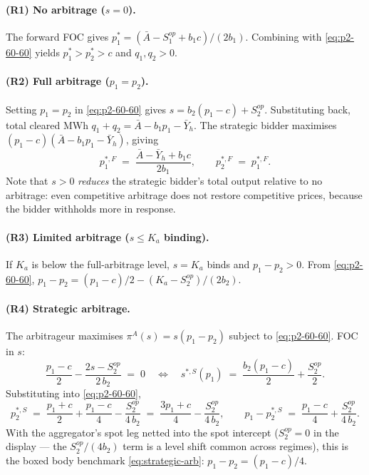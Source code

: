 \documentclass[11pt,a4paper]{article}
\theoremstyle{definition}
\theoremstyle{remark}
\theoremstyle{plain}
\begin{document}
\paragraph{(R1) No arbitrage ($s = 0$).} The forward FOC gives $p_1^* = (\bar A - S^{op}_1 + b_1 c)/(2 b_1)$. Combining with \eqref{eq:p2-60-60} yields $p_1^* > p_2^* > c$ and $q_1, q_2 > 0$.

\paragraph{(R2) Full arbitrage ($p_1 = p_2$).} Setting $p_1 = p_2$ in \eqref{eq:p2-60-60} gives $s = b_2(p_1 - c) + S^{op}_2$. Substituting back, total cleared MWh $q_1 + q_2 = \bar A - b_1 p_1 - \bar Y_h$. The strategic bidder maximises $(p_1 - c)(\bar A - b_1 p_1 - \bar Y_h)$, giving
\[
p_1^{*,F} \;=\; \frac{\bar A - \bar Y_h + b_1 c}{2 b_1}, \qquad p_2^{*,F} \;=\; p_1^{*,F}.
\]
Note that $s > 0$ \emph{reduces} the strategic bidder's total output relative to no arbitrage: even competitive arbitrage does not restore competitive prices, because the bidder withholds more in response.

\paragraph{(R3) Limited arbitrage ($s \le K_a$ binding).} If $K_a$ is below the full-arbitrage level, $s = K_a$ binds and $p_1 - p_2 > 0$. From \eqref{eq:p2-60-60}, $p_1 - p_2 = (p_1 - c)/2 - (K_a - S^{op}_2)/(2 b_2)$.

\paragraph{(R4) Strategic arbitrage.} The arbitrageur maximises $\pi^A(s) = s(p_1 - p_2)$ subject to \eqref{eq:p2-60-60}. FOC in $s$:
\[
\frac{p_1 - c}{2} - \frac{2 s - S^{op}_2}{2\, b_2} \;=\; 0
\quad\Longleftrightarrow\quad
s^{*,S}(p_1) \;=\; \frac{b_2 (p_1 - c)}{2} + \frac{S^{op}_2}{2}.
\]
Substituting into \eqref{eq:p2-60-60},
\[
p_2^{*,S} \;=\; \frac{p_1 + c}{2} + \frac{p_1 - c}{4} - \frac{S^{op}_2}{4\, b_2} \;=\; \frac{3 p_1 + c}{4} - \frac{S^{op}_2}{4\, b_2},
\qquad
p_1 - p_2^{*,S} \;=\; \frac{p_1 - c}{4} + \frac{S^{op}_2}{4\, b_2}.
\]
With the aggregator's spot leg netted into the spot intercept ($S^{op}_2 = 0$ in the display --- the $S^{op}_2/(4 b_2)$ term is a level shift common across regimes), this is the boxed body benchmark \eqref{eq:strategic-arb}: $p_1 - p_2 = (p_1 - c)/4$.
\end{document}
